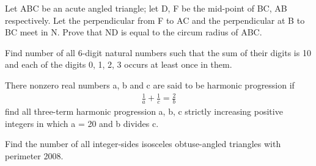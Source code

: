 \item Let ABC be an acute angled triangle; let D, F be the mid-point of BC, AB respectively. Let the perpendicular from F to AC and the perpendicular at B to BC meet in N. Prove that ND is equal to the circum radius of ABC.

\item Find number of all 6-digit natural numbers such that the sum of their digits is 10 and each of the digits 0, 1, 2, 3 occurs at least once in them.

\item There nonzero real numbers a, b and c are said to be harmonic progression if 
\begin{align*}
\frac{1}{a} + \frac{1}{c} = \frac{2}{b}
\end{align*}
find all three-term harmonic progression a, b, c strictly increasing positive integers in which a = 20 and b divides c.

\item Find the number of all integer-sides isosceles obtuse-angled triangles with perimeter 2008.

